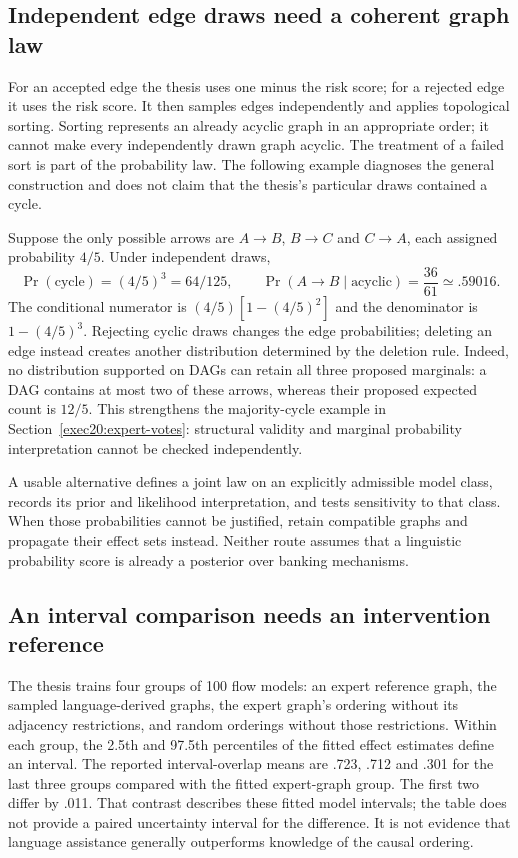 \subsection{Independent edge draws need a coherent graph law}

For an accepted edge the thesis uses one minus the risk score; for a rejected
edge it uses the risk score. It then samples edges independently and applies
topological sorting. Sorting represents an already acyclic graph in an
appropriate order; it cannot make every independently drawn graph acyclic.
The treatment of a failed sort is part of the probability law. The following
example diagnoses the general construction and does not claim that the
thesis's particular draws contained a cycle. \citep{rel64molero}

Suppose the only possible arrows are $A\to B$, $B\to C$ and $C\to A$,
each assigned probability $4/5$. Under independent draws,
\[
 \Pr(\text{cycle})=(4/5)^3=64/125,\qquad
 \Pr(A\to B\mid\text{acyclic})=\frac{36}{61}\simeq.59016.
\]
The conditional numerator is $(4/5)[1-(4/5)^2]$ and the denominator
is $1-(4/5)^3$. Rejecting cyclic draws changes the edge probabilities;
deleting an edge instead creates another distribution determined by the
deletion rule. Indeed, no distribution supported on DAGs can retain all
three proposed marginals: a DAG contains at most two of these arrows, whereas
their proposed expected count is $12/5$. This strengthens the majority-cycle
example in Section~\ref{exec20:expert-votes}: structural validity and
marginal probability interpretation cannot be checked independently.

A usable alternative defines a joint law on an explicitly admissible model
class, records its prior and likelihood interpretation, and tests sensitivity
to that class. When those probabilities cannot be justified, retain compatible
graphs and propagate their effect sets instead. Neither route assumes that a
linguistic probability score is already a posterior over banking mechanisms.

\subsection{An interval comparison needs an intervention reference}

The thesis trains four groups of 100 flow models: an expert reference graph,
the sampled language-derived graphs, the expert graph's ordering without its
adjacency restrictions, and random orderings without those restrictions.
Within each group, the 2.5th and 97.5th percentiles of the fitted effect
estimates define an interval. The reported interval-overlap means are .723,
.712 and .301 for the last three groups compared with the fitted expert-graph
group. The first two differ by .011. That contrast describes these fitted
model intervals; the table does not provide a paired uncertainty interval for
the difference. It is not evidence that language assistance generally
outperforms knowledge of the causal ordering. \citep{rel64molero}

